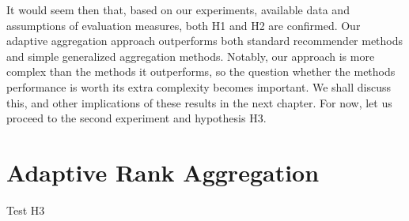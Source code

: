 It would seem then that, based on our experiments, available data
and assumptions of evaluation measures, both H1 and H2 are confirmed.
Our adaptive aggregation approach outperforms both standard recommender
methods and simple generalized aggregation methods.
Notably, our approach is more complex than the methods it outperforms,
so the question whether the methods performance is worth its extra complexity becomes important.
We shall discuss this, and other implications of these results in the next chapter.
For now, let us proceed to the second experiment and hypothesis H3.


\section{Adaptive Rank Aggregation}

Test H3





